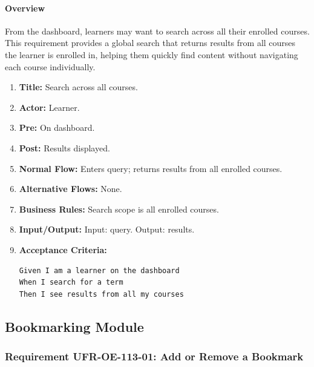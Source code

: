 \paragraph{Overview}
From the dashboard, learners may want to search across all their enrolled courses. This requirement provides a global search that returns results from all courses the learner is enrolled in, helping them quickly find content without navigating each course individually.
\begin{enumerate}[label=\textbf{\arabic*.}]
\item \textbf{Title:} Search across all courses.
\item \textbf{Actor:} Learner.
\item \textbf{Pre:} On dashboard.
\item \textbf{Post:} Results displayed.
\item \textbf{Normal Flow:} Enters query; returns results from all enrolled courses.
\item \textbf{Alternative Flows:} None.
\item \textbf{Business Rules:} Search scope is all enrolled courses.
\item \textbf{Input/Output:} Input: query. Output: results.
\item \textbf{Acceptance Criteria:}
    \begin{verbatim}
Given I am a learner on the dashboard
When I search for a term
Then I see results from all my courses
    \end{verbatim}
\end{enumerate}

\subsection{Bookmarking Module}
\subsubsection{Requirement UFR-OE-113-01: Add or Remove a Bookmark}
